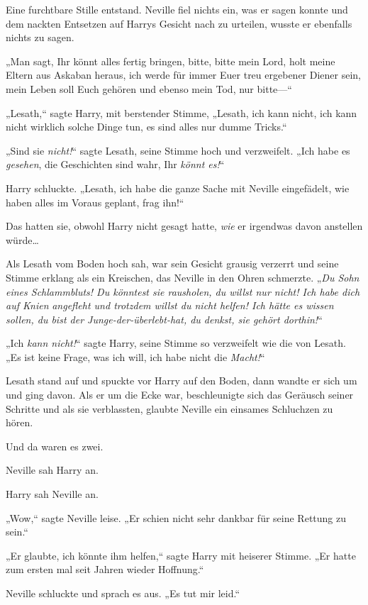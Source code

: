 {Eine furchtbare Stille entstand. Neville fiel nichts ein, was er sagen konnte und dem nackten Entsetzen auf Harrys Gesicht nach zu urteilen, wusste er ebenfalls nichts zu sagen.

„Man sagt, Ihr könnt alles fertig bringen, bitte, bitte mein Lord, holt meine Eltern aus Askaban heraus, ich werde für immer Euer treu ergebener Diener sein, mein Leben soll Euch gehören und ebenso mein Tod, nur bitte—“

„Lesath,“ sagte Harry, mit berstender Stimme, „Lesath, ich kann nicht, ich kann nicht wirklich solche Dinge tun, es sind alles nur dumme Tricks.“

„Sind sie \emph{nicht!}“ sagte Lesath, seine Stimme hoch und verzweifelt. „Ich habe es \emph{gesehen}, die Geschichten sind wahr, Ihr \emph{könnt es!}“

Harry schluckte. „Lesath, ich habe die ganze Sache mit Neville eingefädelt, wie haben alles im Voraus geplant, frag ihn!“

Das hatten sie, obwohl Harry nicht gesagt hatte, \emph{wie} er irgendwas davon anstellen würde…

Als Lesath vom Boden hoch sah, war sein Gesicht grausig verzerrt und seine Stimme erklang als ein Kreischen, das Neville in den Ohren schmerzte. „\emph{Du Sohn eines Schlammbluts! Du könntest sie rausholen, du willst nur nicht! Ich habe dich} \emph{auf Knien} \emph{angefleht und trotzdem willst du nicht helfen! Ich hätte es wissen sollen, du bist der Junge-der-überlebt-hat, du denkst, sie gehört dorthin!}“

„Ich \emph{kann nicht!}“ sagte Harry, seine Stimme so verzweifelt wie die von Lesath. „Es ist keine Frage, was ich will, ich habe nicht die \emph{Macht!}“

Lesath stand auf und spuckte vor Harry auf den Boden, dann wandte er sich um und ging davon. Als er um die Ecke war, beschleunigte sich das Geräusch seiner Schritte und als sie verblassten, glaubte Neville ein einsames Schluchzen zu hören.

Und da waren es zwei.

Neville sah Harry an.

Harry sah Neville an.

„Wow,“ sagte Neville leise. „Er schien nicht sehr dankbar für seine Rettung zu sein.“

„Er glaubte, ich könnte ihm helfen,“ sagte Harry mit heiserer Stimme. „Er hatte zum ersten mal seit Jahren wieder Hoffnung.“

Neville schluckte und sprach es aus. „Es tut mir leid.“

}
